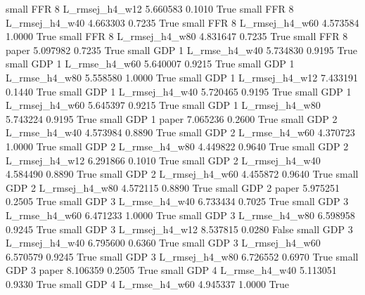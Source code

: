      small      FFR                 8 L_rmsej_h4_w12   5.660583      0.1010    True
     small      FFR                 8 L_rmsej_h4_w40   4.663303      0.7235    True
     small      FFR                 8 L_rmsej_h4_w60   4.573584      1.0000    True
     small      FFR                 8 L_rmsej_h4_w80   4.831647      0.7235    True
     small      FFR                 8          paper   5.097982      0.7235    True
     small      GDP                 1  L_rmse_h4_w40   5.734830      0.9195    True
     small      GDP                 1  L_rmse_h4_w60   5.640007      0.9215    True
     small      GDP                 1  L_rmse_h4_w80   5.558580      1.0000    True
     small      GDP                 1 L_rmsej_h4_w12   7.433191      0.1440    True
     small      GDP                 1 L_rmsej_h4_w40   5.720465      0.9195    True
     small      GDP                 1 L_rmsej_h4_w60   5.645397      0.9215    True
     small      GDP                 1 L_rmsej_h4_w80   5.743224      0.9195    True
     small      GDP                 1          paper   7.065236      0.2600    True
     small      GDP                 2  L_rmse_h4_w40   4.573984      0.8890    True
     small      GDP                 2  L_rmse_h4_w60   4.370723      1.0000    True
     small      GDP                 2  L_rmse_h4_w80   4.449822      0.9640    True
     small      GDP                 2 L_rmsej_h4_w12   6.291866      0.1010    True
     small      GDP                 2 L_rmsej_h4_w40   4.584490      0.8890    True
     small      GDP                 2 L_rmsej_h4_w60   4.455872      0.9640    True
     small      GDP                 2 L_rmsej_h4_w80   4.572115      0.8890    True
     small      GDP                 2          paper   5.975251      0.2505    True
     small      GDP                 3  L_rmse_h4_w40   6.733434      0.7025    True
     small      GDP                 3  L_rmse_h4_w60   6.471233      1.0000    True
     small      GDP                 3  L_rmse_h4_w80   6.598958      0.9245    True
     small      GDP                 3 L_rmsej_h4_w12   8.537815      0.0280   False
     small      GDP                 3 L_rmsej_h4_w40   6.795600      0.6360    True
     small      GDP                 3 L_rmsej_h4_w60   6.570579      0.9245    True
     small      GDP                 3 L_rmsej_h4_w80   6.726552      0.6970    True
     small      GDP                 3          paper   8.106359      0.2505    True
     small      GDP                 4  L_rmse_h4_w40   5.113051      0.9330    True
     small      GDP                 4  L_rmse_h4_w60   4.945337      1.0000    True
